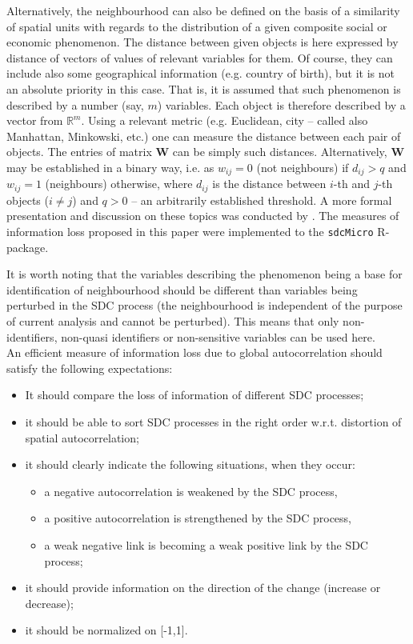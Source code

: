 Alternatively, the neighbourhood can also be defined on the basis of a similarity of spatial units with regards to the distribution of a given composite social or economic phenomenon. The distance between given objects is here expressed by distance of vectors of values of relevant variables for them. Of course, they can include also some geographical information (e.g. country of birth), but it is not an absolute priority in this case. That is, it is assumed that such phenomenon is described by a number (say, $m$) variables. Each object is therefore described by a vector from $\mathbb{R}^m$. Using a relevant metric (e.g. Euclidean, city -- called also Manhattan, Minkowski, etc.) one can measure the distance between each pair of objects. The entries of matrix $\mathbf{W}$ can be simply such distances. Alternatively, $\mathbf{W}$ may be established in a binary way, i.e. as $w_{ij}=0$ (not neighbours) if $d_{ij}>q$ and $w_{ij}=1$ (neighbours) otherwise, where $d_{ij}$ is the distance between $i$-th and $j$-th objects ($i \neq j$) and $q>0$ -- an arbitrarily established threshold. A more formal presentation and discussion on these topics was conducted by \cite{Mlodak2013}. The measures of information loss proposed in this paper were implemented to the \texttt{sdcMicro} R-package.   

It is worth noting that the variables describing the phenomenon being a base for identification of neighbourhood should be different than variables being perturbed in the SDC process (the neighbourhood is independent of the purpose of current analysis and cannot be perturbed). This means that only non-identifiers, non-quasi identifiers or non-sensitive variables can be used here.\\

An efficient measure of information loss due to global autocorrelation should satisfy the following expectations:
\begin{itemize}
    \item It should compare the loss of information of different SDC processes;
    \item it should be able to sort SDC processes in the right order w.r.t. distortion of spatial autocorrelation;
    \item it should clearly indicate the following situations, when they occur:
    \begin{itemize}
        \item a negative autocorrelation is weakened by the SDC process, 
        \item a positive autocorrelation is strengthened by the SDC process,
        \item a weak negative link is becoming a weak positive link by the SDC process;
    \end{itemize}
    \item it should provide information on the direction of the change (increase or decrease);
    \item it should be normalized on [-1,1].
\end{itemize}

